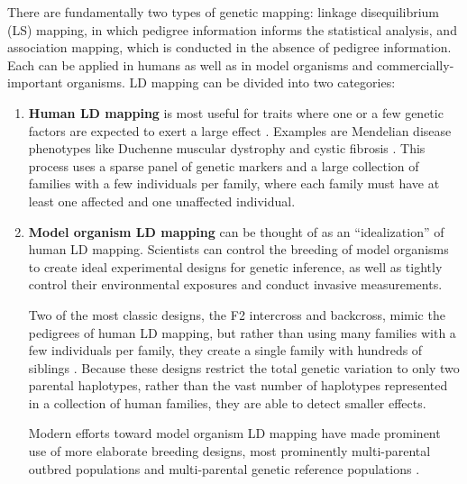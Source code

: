 There are fundamentally two types of genetic mapping: linkage disequilibrium (LS) mapping, in which pedigree information informs the statistical analysis, and association mapping, which is conducted in the absence of pedigree information.
Each can be applied in humans as well as in model organisms and commercially-important organisms.
LD mapping can be divided into two categories:
\begin{enumerate}
	\item \textbf{Human LD mapping} is most useful for traits where one or a few genetic factors are expected to exert a large effect \citep{Botstein1980}.
	Examples are Mendelian disease phenotypes like Duchenne muscular dystrophy \citep{Brown1985,Murray1982} and cystic fibrosis \citep{Tsui1985,Wainwright1985,White1985}.
	This process uses a sparse panel of genetic markers and a large collection of families with a few individuals per family, where each family must have at least one affected and one unaffected individual.
	
	\item \textbf{Model organism LD mapping} can be thought of as an ``idealization'' of human LD mapping.
	Scientists can control the breeding of model organisms to create ideal experimental designs for genetic inference, as well as tightly control their environmental exposures and conduct invasive measurements.

	Two of the most classic designs, the F2 intercross and backcross, mimic the pedigrees of human LD mapping, but rather than using many families with a few individuals per family, they create a single family with hundreds of siblings \citep{Lynch1998,Lander1987,Lander1989a}.
	Because these designs restrict the total genetic variation to only two parental haplotypes, rather than the vast number of haplotypes represented in a collection of human families, they are able to detect smaller effects.

	Modern efforts toward model organism LD mapping have made prominent use of more elaborate breeding designs, most prominently multi-parental outbred populations \citep{Ghazalpour2012b,Svenson2012a} and multi-parental genetic reference populations \citep{TheComplexTraitConsortium2004,MacKay2012,King2012}.
\end{enumerate}

